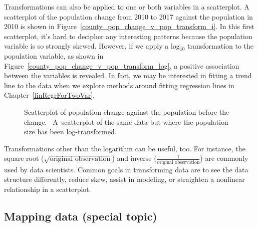 Transformations can also be applied to one or both
variables in a scatterplot.
A scatterplot of the population change from 2010 to 2017
against the population in 2010 is shown in Figure~\ref{county_pop_change_v_pop_transform_i}.
In this first scatterplot, it's hard to decipher any
interesting patterns because the population variable
is so strongly skewed.
However, if we apply a log$_{10}$ transformation to
the population variable, as shown in
Figure~\ref{county_pop_change_v_pop_transform_log},
a positive association between the variables is revealed.
In fact, we may be interested in fitting a trend line to
the data when we explore methods around fitting regression
lines in Chapter~\ref{linRegrForTwoVar}.

\begin{figure}
  \centering
  \caption{
      Scatterplot of population change
      against the population before the change.
      ~A~scatterplot
      of the same data but where the population
      size has been log-transformed.}
  \label{county_pop_change_v_pop_transform_main}
\end{figure}

Transformations other than the logarithm can be useful, too.
For instance, the square root
($\sqrt{\text{original observation}}$) and inverse
($\frac{1}{\text{original observation}}$) are commonly used
by data scientists.
Common goals in transforming data are to see the data
structure differently, reduce skew, assist in modeling,
or straighten a nonlinear relationship in a scatterplot.



\D{\newpage}

\subsection{Mapping data (special topic)}


